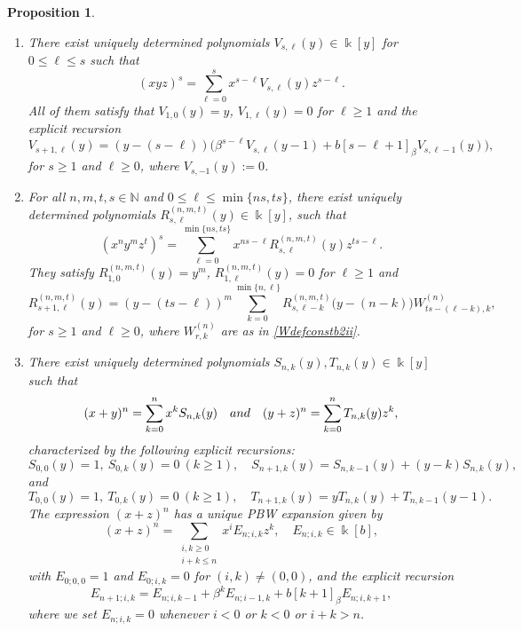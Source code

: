 \documentclass[10pt,a4paper]{amsart}
\newtheorem{proposition}{Proposition}
\begin{document}
\begin{proposition}
\begin{enumerate}
\item [\rm (3)] There exist uniquely determined polynomials $V_{s,\ell}(y)\in\Bbbk[y]$ for $0\le \ell\le s$ such that
\begin{equation}\label{Vdefconstb2ii}
(xyz)^s=\sum_{\ell=0}^{s} x^{s-\ell}V_{s,\ell}(y)z^{s-\ell}.
\end{equation}
All of them satisfy that $V_{1,0}(y) = y$, $V_{1,\ell}(y) = 0$ for $\ell\ge 1$ and the explicit recursion
\begin{equation}\label{Vrecconstb2ii}
V_{s+1,\ell}(y) =(y-(s-\ell))\Big(\beta^{s-\ell}V_{s,\ell}(y-1)+b[s-\ell+1]_\beta  V_{s,\ell-1}(y)\Big), 
\end{equation}
for $s\ge 1$ and $\ell\ge 0$, where $V_{s,-1}(y):=0$.

\item[\rm (4)] For all $n, m, t, s\in\mathbb{N}$ and  $0\le \ell\le \min\{ns,ts\}$, there exist uniquely determined polynomials
$R^{(n,m,t)}_{s,\ell}(y)\in\Bbbk[y]$,  such that
\begin{equation}\label{Rdefconstb2ii}
(x^n y^m z^t)^s = \sum_{\ell=0}^{\min\{ns,ts\}} x^{ns-\ell}R^{(n,m,t)}_{s,\ell}(y)z^{ts-\ell}.
\end{equation}
They satisfy $R^{(n,m,t)}_{1,0}(y)=y^m$, $R^{(n,m,t)}_{1,\ell}(y)=0$ for $\ell\ge 1$ and 
\begin{equation}\label{Rrecconstb2ii}
R^{(n,m,t)}_{s+1,\ell}(y)=(y-(ts-\ell))^{m} \sum_{k=0}^{\min\{n,\ell\}}R^{(n,m,t)}_{s,\ell-k}\big(y-(n-k)\big)
W^{(n)}_{ts-(\ell-k),k},
\end{equation}
for $s\ge 1$ and $\ell\ge 0$, where $W^{(n)}_{r,k}$ are as in \eqref{Wdefconstb2ii}.

\item[\rm (5)] There exist uniquely determined polynomials $S_{n,k}(y),T_{n,k}(y)\in\Bbbk[y]$ such that
\[
(x+y)^n = \sum_{k=0}^{n} x^{k}S_{n,k}(y) \quad {\rm and} \quad (y+z)^n=\sum_{k=0}^{n} T_{n,k}(y)z^{k},
\]
characterized by the following explicit recursions:
\[
S_{0,0}(y) = 1,\ S_{0,k}(y)=0\ (k\ge 1),\quad S_{n+1,k}(y)=S_{n,k-1}(y)+(y-k)S_{n,k}(y),
\]
and 
\[
T_{0,0}(y)=1,\ T_{0,k}(y)=0\ (k\ge 1),\quad T_{n+1,k}(y)=yT_{n,k}(y)+T_{n,k-1}(y-1).
\]
The expression $(x+z)^n$ has a unique PBW expansion given by
\begin{equation}\label{Edefconstb2ii}
(x+z)^n = \sum_{\substack{i,k\ge 0\\ i+k\le n}} x^{i}E_{n;i,k}z^{k}, \quad E_{n;i,k}\in\Bbbk[b],
\end{equation}
with $E_{0;0,0}=1$ and $E_{0;i,k}=0$ for $(i,k)\neq(0,0)$, and the explicit recursion
\begin{equation}\label{Erecconstb2ii}
E_{n+1;i,k}=E_{n;i,k-1}+\beta^{k}E_{n;i-1,k}+b[k+1]_\beta E_{n;i,k+1},
\end{equation}
where we set $E_{n;i,k} = 0$ whenever $i < 0$ or $k < 0$ or $i + k > n$.
\end{enumerate}
\end{proposition}
\end{document}

